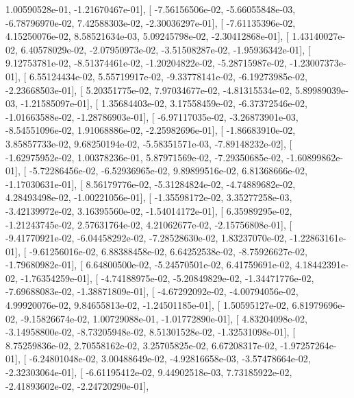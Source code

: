 \documentclass{article}
\begin{document}
          1.00590528e-01,  -1.21670467e-01],
       [ -7.56156506e-02,  -5.66055848e-03,  -6.78796970e-02,
          7.42588303e-02,  -2.30036297e-01],
       [ -7.61135396e-02,   4.15250076e-02,   8.58521634e-03,
          5.09245798e-02,  -2.30412868e-01],
       [  1.43140027e-02,   6.40578029e-02,  -2.07950973e-02,
         -3.51508287e-02,  -1.95936342e-01],
       [  9.12753781e-02,  -8.51374461e-02,  -1.20204822e-02,
         -5.28715987e-02,  -1.23007373e-01],
       [  6.55124434e-02,   5.55719917e-02,  -9.33778141e-02,
         -6.19273985e-02,  -2.23668503e-01],
       [  5.20351775e-02,   7.97034677e-02,  -4.81315534e-02,
          5.89989039e-03,  -1.21585097e-01],
       [  1.35684403e-02,   3.17558459e-02,  -6.37372546e-02,
         -1.01663588e-02,  -1.28786903e-01],
       [ -6.97117035e-02,  -3.26873901e-03,  -8.54551096e-02,
          1.91068886e-02,  -2.25982696e-01],
       [ -1.86683910e-02,   3.85857733e-02,   9.68250194e-02,
         -5.58351571e-03,  -7.89148232e-02],
       [ -1.62975952e-02,   1.00378236e-01,   5.87971569e-02,
         -7.29350685e-02,  -1.60899862e-01],
       [ -5.72286456e-02,  -6.52936965e-02,   9.89899516e-02,
          6.81368666e-02,  -1.17030631e-01],
       [  8.56179776e-02,  -5.31284824e-02,  -4.74889682e-02,
          4.28493498e-02,  -1.00221056e-01],
       [ -1.35598172e-02,   3.35277258e-03,  -3.42139972e-02,
          3.16395560e-02,  -1.54014172e-01],
       [  6.35989295e-02,  -1.21243745e-02,   2.57631764e-02,
          4.21062677e-02,  -2.15756808e-01],
       [ -9.41770921e-02,  -6.04458292e-02,  -7.28528630e-02,
          1.83237070e-02,  -1.22863161e-01],
       [ -9.61256016e-02,   6.88388458e-02,   6.64252538e-02,
         -8.75926627e-02,  -1.79680982e-01],
       [  6.64800500e-02,  -5.24570501e-02,   6.41759691e-02,
          4.18442391e-02,  -1.76354259e-01],
       [ -4.74188975e-02,  -5.20849829e-02,  -1.34471776e-02,
         -7.69688083e-02,  -1.38871809e-01],
       [ -4.67292092e-02,  -4.00794056e-02,   4.99920076e-02,
          9.84655813e-02,  -1.24501185e-01],
       [  1.50595127e-02,   6.81979696e-02,  -9.15826674e-02,
          1.00729088e-01,  -1.01772890e-01],
       [  4.83204098e-02,  -3.14958800e-02,  -8.73205948e-02,
          8.51301528e-02,  -1.32531098e-01],
       [  8.75259836e-02,   2.70558162e-02,   3.25705825e-02,
          6.67208317e-02,  -1.97257264e-01],
       [ -6.24801048e-02,   3.00488649e-02,  -4.92816658e-03,
         -3.57478664e-02,  -2.32303064e-01],
       [ -6.61195412e-02,   9.44902518e-03,   7.73185922e-02,
         -2.41893602e-02,  -2.24720290e-01],
\end{document}
